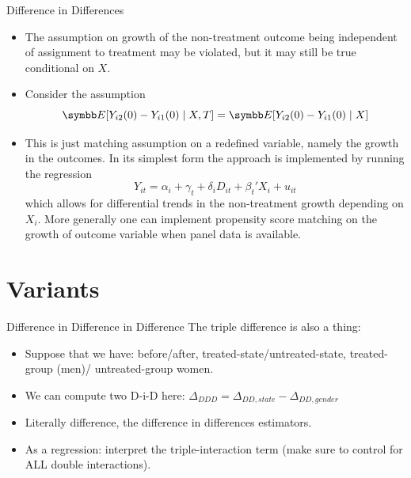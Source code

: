 \documentclass[aspectratio=169,11pt]{beamer}
\begin{document}
\begin{frame}{Difference in Differences}
\begin{itemize}
\item The assumption on growth of the non-treatment outcome being independent of assignment to treatment may be violated, but it may still be true conditional on $X$.
\item Consider the assumption
$$ \E[Y_{i2}(0)- Y_{i1}(0) \mid X,T] = \E[Y_{i2}(0)- Y_{i1}(0) \mid X] $$ 
\item This is just matching assumption on a redefined variable, namely the growth in the outcomes. In its simplest form the approach is implemented by running the regression
$$ Y_{it} = \alpha_i + \gamma_t + \delta_i D_{it} + \beta_t' X_i + u_{it}$$ 
which allows for differential trends in the non-treatment growth depending on $X_i$. More generally one can implement propensity score matching on the growth of outcome variable when panel data is available.
\end{itemize}
\end{frame}

\section{Variants}

\begin{frame}{Difference in Difference in Difference}
The triple difference is also a thing:
\begin{itemize}
\item Suppose that we have: before/after, treated-state/untreated-state, treated-group (men)/ untreated-group women.
\item We can compute two D-i-D here: $\Delta_{DDD} = \Delta_{DD,state} - \Delta_{DD,gender}$ 
\item Literally difference, the difference in differences estimators.
\item As a regression: interpret the triple-interaction term (make sure to control for ALL double interactions).
\end{itemize}
\end{frame}
\end{document}
